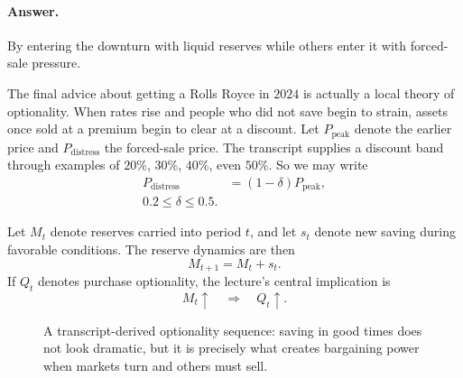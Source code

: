 \paragraph{Answer.} By entering the downturn with liquid reserves while others enter it with forced-sale pressure.

The final advice about getting a Rolls Royce in \(2024\) is actually a local theory of optionality. When rates rise and people who did not save begin to strain, assets once sold at a premium begin to clear at a discount. Let \(P_{\mathrm{peak}}\) denote the earlier price and \(P_{\mathrm{distress}}\) the forced-sale price. The transcript supplies a discount band through examples of \(20\%\), \(30\%\), \(40\%\), even \(50\%\). So we may write
\begin{align}
P_{\mathrm{distress}} &= (1-\delta)P_{\mathrm{peak}},\\
0.2 \le \delta \le 0.5.
\end{align}

Let \(M_t\) denote reserves carried into period \(t\), and let \(s_t\) denote new saving during favorable conditions. The reserve dynamics are then
\begin{equation}
M_{t+1} = M_t + s_t.
\end{equation}
If \(Q_t\) denotes purchase optionality, the lecture's central implication is
\begin{equation}
M_t \uparrow \quad \Longrightarrow \quad Q_t \uparrow.
\end{equation}

\begin{figure}[h]
\centering
{}
\caption{A transcript-derived optionality sequence: saving in good times does not look dramatic, but it is precisely what creates bargaining power when markets turn and others must sell.}
\end{figure}

